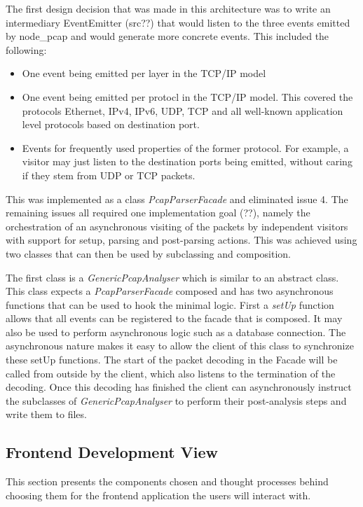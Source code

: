 The first design decision that was made in this architecture was to write an intermediary EventEmitter (src??) that would listen to the three events emitted by node\_pcap and would generate more concrete events. This included the following:
\begin{itemize}
    \item One event being emitted per layer in the TCP/IP model
    \item One event being emitted per protocl in the TCP/IP model. This covered the protocols Ethernet, IPv4, IPv6, UDP, TCP and all well-known application level protocols based on destination port.
    \item Events for frequently used properties of the former protocol. For example, a visitor may just listen to the destination ports being emitted, without caring if they stem from UDP or TCP packets.
\end{itemize}{}
This was implemented as a class \textit{PcapParserFacade} and eliminated issue 4. The remaining issues all required one implementation goal (??), namely the orchestration of an asynchronous visiting of the packets by independent visitors with support for setup, parsing and post-parsing actions. This was achieved using two classes that can then be used by subclassing and composition.

The first class is a \textit{GenericPcapAnalyser} which is similar to an abstract class. This class expects a  \textit{PcapParserFacade} composed and has two asynchronous functions that can be used to hook the minimal logic. First a \textit{setUp} function allows that all events can be registered to the facade that is composed. It may also be used to perform asynchronous logic such as a database connection. The asynchronous nature makes it easy to allow the client of this class to synchronize these setUp functions.
The start of the packet decoding in the Facade will be called from outside by the client, which also listens to the termination of the decoding. Once this decoding has finished the client can asynchronously instruct the subclasses of \textit{GenericPcapAnalyser} to perform their post-analysis steps and write them to files.


 \subsection{Frontend Development View}
 This section presents the components chosen and thought processes behind choosing them for the frontend application the users will interact with.  
